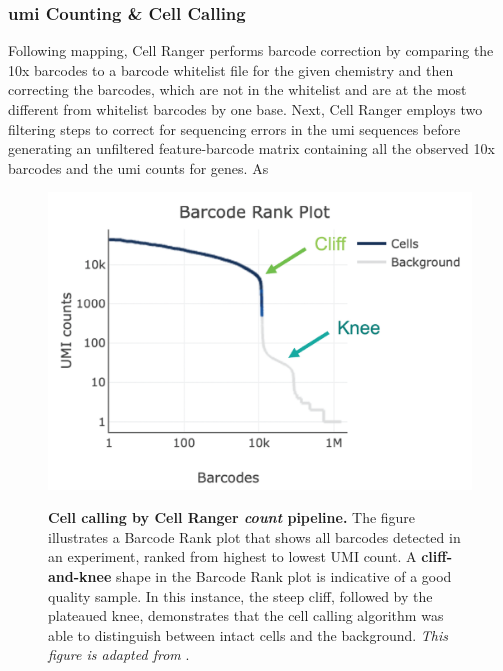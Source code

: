 \subsubsection{\gls{umi} Counting \& Cell Calling}

Following mapping, Cell Ranger performs barcode correction by comparing the 10x barcodes to a barcode whitelist file for the given chemistry and then correcting the barcodes, which are not in the whitelist and are at the most different from whitelist barcodes by one base. Next, Cell Ranger employs two filtering steps to correct for sequencing errors in the \gls{umi} sequences before generating an unfiltered feature-barcode matrix containing all the observed 10x barcodes and the \gls{umi} counts for genes. As

\begin{figure}
  \centering
  \caption[Cell calling by Cell Ranger \textit{count}]{\textbf{Cell calling by Cell Ranger \textit{count} pipeline.} The figure illustrates a Barcode Rank plot that shows all barcodes detected in an experiment, ranked from highest to lowest UMI count. A \textbf{cliff-and-knee} shape in the Barcode Rank plot is indicative of a good quality sample. In this instance, the steep cliff, followed by the plateaued knee, demonstrates that the cell calling algorithm was able to distinguish between intact cells and the background. \textit{This figure is adapted from }\textbf{\cite{noauthor_barcode_nodate}}.}
  \includegraphics[width=0.5\linewidth]{Chapter1/Fig/F1-10-03.png}
  \label{fig:chp1_cellcall}
\end{figure}

